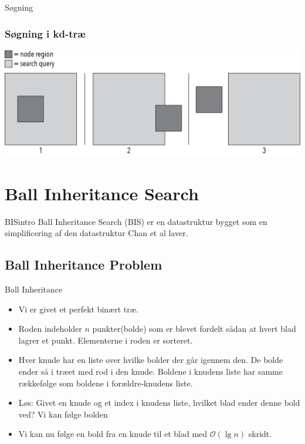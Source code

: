 \documentclass[pdf]{beamer}
\begin{document}
\begin{frame}{Søgning}
  \frametitle{Søgning i kd-træ}
  \begin{center}
    \includegraphics[scale=0.75]{pictures/search_query_overlap.png}
  \end{center}
\end{frame}



\section{Ball Inheritance Search}
\begin{frame}{BISintro}
  Ball Inheritance Search (BIS) er en datastruktur bygget som en simplificering af den datastruktur Chan et al laver.

\end{frame}


\subsection{Ball Inheritance Problem}

\begin{frame}{Ball Inheritance}

  \begin{itemize}
    \item Vi er givet et perfekt binært træ.
      \pause
    \item Roden indeholder $n$ punkter(bolde) som er blevet fordelt sådan at hvert blad lagrer et punkt. Elementerne i roden er sorteret.
      \pause
    \item Hver knude har en liste over hvilke bolder der går igennem den. De bolde ender så i træet med rod i den knude. Boldene i knudens liste har samme rækkefølge som boldene i forældre-knudens liste.
     \pause
    \item Løs: Givet en knude og et index i knudens liste, hvilket blad ender denne bold ved? Vi kan følge bolden 
     \pause
    \item Vi kan nu følge en bold fra en knude til et blad med $\mathcal{O}(\lg n)$ skridt.

  \end{itemize}
\end{frame}
\end{document}

